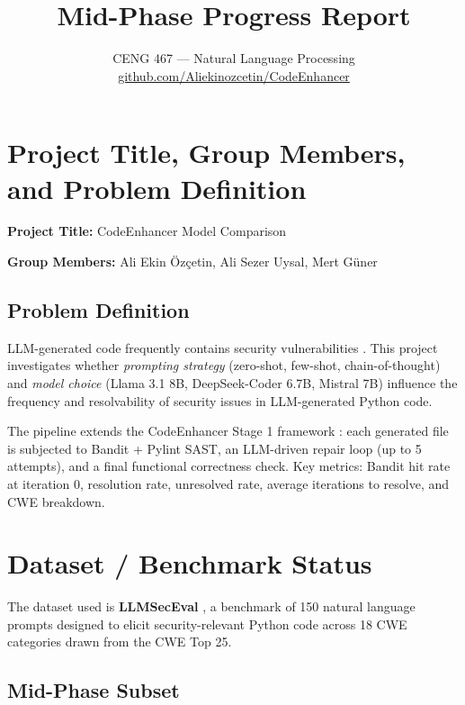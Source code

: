 \documentclass[10pt,a4paper]{article}
\title{\textbf{Mid-Phase Progress Report}}
\author{
    \small CENG 467 — Natural Language Processing \\
    \small \href{https://github.com/Aliekinozcetin/CodeEnhancer}{github.com/Aliekinozcetin/CodeEnhancer}
}
\date{}
\begin{document}
\maketitle

\section{Project Title, Group Members, and Problem Definition}

\textbf{Project Title:} CodeEnhancer Model Comparison

\textbf{Group Members:} Ali Ekin Özçetin, Ali Sezer Uysal, Mert Güner

\subsection*{Problem Definition}

LLM-generated code frequently contains security vulnerabilities \cite{pearce2022asleep,tony2023llmseceval}. This project investigates whether \emph{prompting strategy} (zero-shot, few-shot, chain-of-thought) and \emph{model choice} (Llama 3.1 8B, DeepSeek-Coder 6.7B, Mistral 7B) influence the frequency and resolvability of security issues in LLM-generated Python code.

The pipeline extends the CodeEnhancer Stage 1 framework \cite{nishida2024codeenhancer}: each generated file is subjected to Bandit + Pylint SAST, an LLM-driven repair loop (up to 5 attempts), and a final functional correctness check. Key metrics: Bandit hit rate at iteration 0, resolution rate, unresolved rate, average iterations to resolve, and CWE breakdown.

\section{Dataset / Benchmark Status}

The dataset used is \textbf{LLMSecEval} \cite{tony2023llmseceval}, a benchmark of 150 natural language prompts designed to elicit security-relevant Python code across 18 CWE categories drawn from the CWE Top 25.

\subsection*{Mid-Phase Subset}
\end{document}
